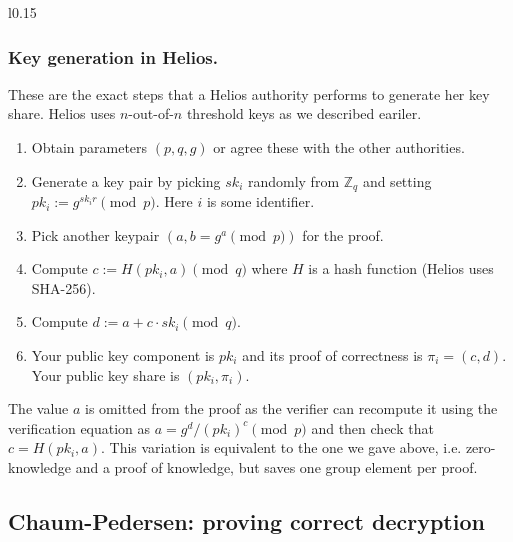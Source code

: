 \documentclass[envcountsame]{llncs}
\newenvironment{helios}{\begin{framed}
\vspace{-18pt}
\begin{wrapfigure}{l}{0.15\textwidth}
\vspace{-12pt}\quad{\Huge \Sun}
\end{wrapfigure}}{\end{framed}}
\begin{document}
\begin{helios}
\subsubsection{Key generation in Helios.}
These are the exact steps that a Helios authority performs to generate her key
share. Helios uses $n$-out-of-$n$ threshold keys as we described eariler.
\vspace{12pt}

\noindent\hspace{6pt}\begin{minipage}{0.8\textwidth}
\begin{enumerate}
\item Obtain parameters $(p, q, g)$ or agree these with the other authorities.
\item Generate a key pair by picking $sk_i$ randomly from $\mathbb Z_q$ and
setting $pk_i := g^{sk_ir} \pmod{p}$. Here $i$ is some identifier.
\item Pick another keypair $(a, b = g^a \pmod{p})$ for the proof.
\item Compute $c := H(pk_i, a) \pmod{q}$ where $H$ is a hash function (Helios
uses SHA-256).
\item Compute $d := a + c \cdot sk_i \pmod{q}$.
\item Your public key component is $pk_i$ and its proof of
correctness is $\pi_i = (c, d)$. Your public key share is
$(pk_i, \pi_i)$.
\end{enumerate}
\end{minipage}\vspace{12pt}

The value $a$ is omitted from the proof as the verifier can recompute it using
the verification equation as $a = g^d/(pk_i)^c \pmod{p}$ and then check that $c
= H(pk_i, a)$. This variation is equivalent to the one we gave above, i.e.
zero-knowledge and a proof of knowledge, but saves one group element per proof.
\end{helios}

\subsection{Chaum-Pedersen: proving correct decryption}
\end{document}
